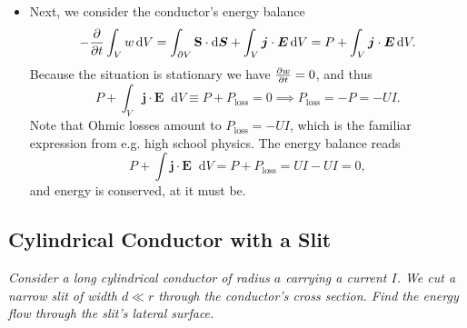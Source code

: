 \documentclass[11pt, a4paper]{article}
\newcommand{\diff}{\mathop{}\!\mathrm{d}} %
\renewcommand{\vec}[1]{\bm{#1}} %
\newcommand{\E}{\vec{E}}  %
\renewcommand{\S}{\mathbf{S}}  %
\begin{document}
\begin{itemize}
	\item Next, we consider the conductor's energy balance
	\begin{equation*}
		- \pdv{t}\int_{V}w \diff V = \int_{\partial V} \S \cdot \diff \vec{S} + \int_{V} \vec{j} \cdot \E \diff V =  P + \int_{V} \vec{j} \cdot \E \diff V.
	\end{equation*}
	Because the situation is stationary we have $ \pdv{w}{t} = 0$, and thus
	\begin{equation*}
		P + \int_{V} \vec{j} \cdot \E \diff V \equiv P + P_{\text{loss}} = 0 \implies P_{\text{loss}} = -P = -UI.
	\end{equation*}
	Note that Ohmic losses amount to $ P_{\text{loss}} = -UI $, which is the familiar expression from e.g. high school physics. The energy balance reads
	\begin{equation*}
		P + \int \vec{j} \cdot \E \diff V =  P + P_{\text{loss}} = UI - UI = 0,
	\end{equation*}
	and energy is conserved, at it must be. 
	
	
\end{itemize}

\subsection{Cylindrical Conductor with a Slit}
\textit{Consider a long cylindrical conductor of radius $ a $ carrying a current $ I $. We cut a narrow slit of width $ d \ll r $ through the conductor's cross section. Find the energy flow through the slit's lateral surface.}
\end{document}

